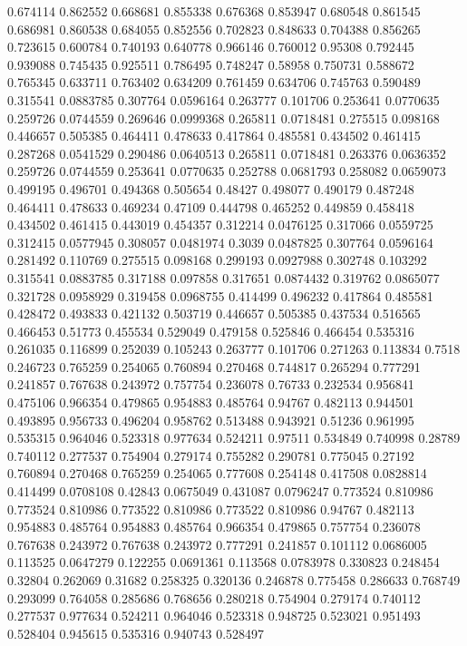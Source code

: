 0.674114 0.862552
0.668681 0.855338
0.676368 0.853947
0.680548 0.861545
0.686981 0.860538
0.684055 0.852556
0.702823 0.848633
0.704388 0.856265
0.723615 0.600784
0.740193 0.640778
0.966146 0.760012
0.95308 0.792445
0.939088 0.745435
0.925511 0.786495
0.748247 0.58958
0.750731 0.588672
0.765345 0.633711
0.763402 0.634209
0.761459 0.634706
0.745763 0.590489
0.315541 0.0883785
0.307764 0.0596164
0.263777 0.101706
0.253641 0.0770635
0.259726 0.0744559
0.269646 0.0999368
0.265811 0.0718481
0.275515 0.098168
0.446657 0.505385
0.464411 0.478633
0.417864 0.485581
0.434502 0.461415
0.287268 0.0541529
0.290486 0.0640513
0.265811 0.0718481
0.263376 0.0636352
0.259726 0.0744559
0.253641 0.0770635
0.252788 0.0681793
0.258082 0.0659073
0.499195 0.496701
0.494368 0.505654
0.48427 0.498077
0.490179 0.487248
0.464411 0.478633
0.469234 0.47109
0.444798 0.465252
0.449859 0.458418
0.434502 0.461415
0.443019 0.454357
0.312214 0.0476125
0.317066 0.0559725
0.312415 0.0577945
0.308057 0.0481974
0.3039 0.0487825
0.307764 0.0596164
0.281492 0.110769
0.275515 0.098168
0.299193 0.0927988
0.302748 0.103292
0.315541 0.0883785
0.317188 0.097858
0.317651 0.0874432
0.319762 0.0865077
0.321728 0.0958929
0.319458 0.0968755
0.414499 0.496232
0.417864 0.485581
0.428472 0.493833
0.421132 0.503719
0.446657 0.505385
0.437534 0.516565
0.466453 0.51773
0.455534 0.529049
0.479158 0.525846
0.466454 0.535316
0.261035 0.116899
0.252039 0.105243
0.263777 0.101706
0.271263 0.113834
0.7518 0.246723
0.765259 0.254065
0.760894 0.270468
0.744817 0.265294
0.777291 0.241857
0.767638 0.243972
0.757754 0.236078
0.76733 0.232534
0.956841 0.475106
0.966354 0.479865
0.954883 0.485764
0.94767 0.482113
0.944501 0.493895
0.956733 0.496204
0.958762 0.513488
0.943921 0.51236
0.961995 0.535315
0.964046 0.523318
0.977634 0.524211
0.97511 0.534849
0.740998 0.28789
0.740112 0.277537
0.754904 0.279174
0.755282 0.290781
0.775045 0.27192
0.760894 0.270468
0.765259 0.254065
0.777608 0.254148
0.417508 0.0828814
0.414499 0.0708108
0.42843 0.0675049
0.431087 0.0796247
0.773524 0.810986
0.773524 0.810986
0.773522 0.810986
0.773522 0.810986
0.94767 0.482113
0.954883 0.485764
0.954883 0.485764
0.966354 0.479865
0.757754 0.236078
0.767638 0.243972
0.767638 0.243972
0.777291 0.241857
0.101112 0.0686005
0.113525 0.0647279
0.122255 0.0691361
0.113568 0.0783978
0.330823 0.248454
0.32804 0.262069
0.31682 0.258325
0.320136 0.246878
0.775458 0.286633
0.768749 0.293099
0.764058 0.285686
0.768656 0.280218
0.754904 0.279174
0.740112 0.277537
0.977634 0.524211
0.964046 0.523318
0.948725 0.523021
0.951493 0.528404
0.945615 0.535316
0.940743 0.528497
